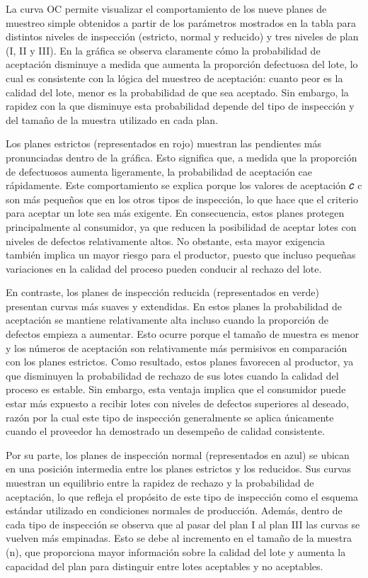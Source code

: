 \documentclass[
  12pt,
]{article}
\begin{document}
La curva OC permite visualizar el comportamiento de los nueve planes de
muestreo simple obtenidos a partir de los parámetros mostrados en la
tabla para distintos niveles de inspección (estricto, normal y reducido)
y tres niveles de plan (I, II y III). En la gráfica se observa
claramente cómo la probabilidad de aceptación disminuye a medida que
aumenta la proporción defectuosa del lote, lo cual es consistente con la
lógica del muestreo de aceptación: cuanto peor es la calidad del lote,
menor es la probabilidad de que sea aceptado. Sin embargo, la rapidez
con la que disminuye esta probabilidad depende del tipo de inspección y
del tamaño de la muestra utilizado en cada plan.

Los planes estrictos (representados en rojo) muestran las pendientes más
pronunciadas dentro de la gráfica. Esto significa que, a medida que la
proporción de defectuosos aumenta ligeramente, la probabilidad de
aceptación cae rápidamente. Este comportamiento se explica porque los
valores de aceptación 𝑐 c son más pequeños que en los otros tipos de
inspección, lo que hace que el criterio para aceptar un lote sea más
exigente. En consecuencia, estos planes protegen principalmente al
consumidor, ya que reducen la posibilidad de aceptar lotes con niveles
de defectos relativamente altos. No obstante, esta mayor exigencia
también implica un mayor riesgo para el productor, puesto que incluso
pequeñas variaciones en la calidad del proceso pueden conducir al
rechazo del lote.

En contraste, los planes de inspección reducida (representados en verde)
presentan curvas más suaves y extendidas. En estos planes la
probabilidad de aceptación se mantiene relativamente alta incluso cuando
la proporción de defectos empieza a aumentar. Esto ocurre porque el
tamaño de muestra es menor y los números de aceptación son relativamente
más permisivos en comparación con los planes estrictos. Como resultado,
estos planes favorecen al productor, ya que disminuyen la probabilidad
de rechazo de sus lotes cuando la calidad del proceso es estable. Sin
embargo, esta ventaja implica que el consumidor puede estar más expuesto
a recibir lotes con niveles de defectos superiores al deseado, razón por
la cual este tipo de inspección generalmente se aplica únicamente cuando
el proveedor ha demostrado un desempeño de calidad consistente.

Por su parte, los planes de inspección normal (representados en azul) se
ubican en una posición intermedia entre los planes estrictos y los
reducidos. Sus curvas muestran un equilibrio entre la rapidez de rechazo
y la probabilidad de aceptación, lo que refleja el propósito de este
tipo de inspección como el esquema estándar utilizado en condiciones
normales de producción. Además, dentro de cada tipo de inspección se
observa que al pasar del plan I al plan III las curvas se vuelven más
empinadas. Esto se debe al incremento en el tamaño de la muestra (n),
que proporciona mayor información sobre la calidad del lote y aumenta la
capacidad del plan para distinguir entre lotes aceptables y no
aceptables.
\end{document}
